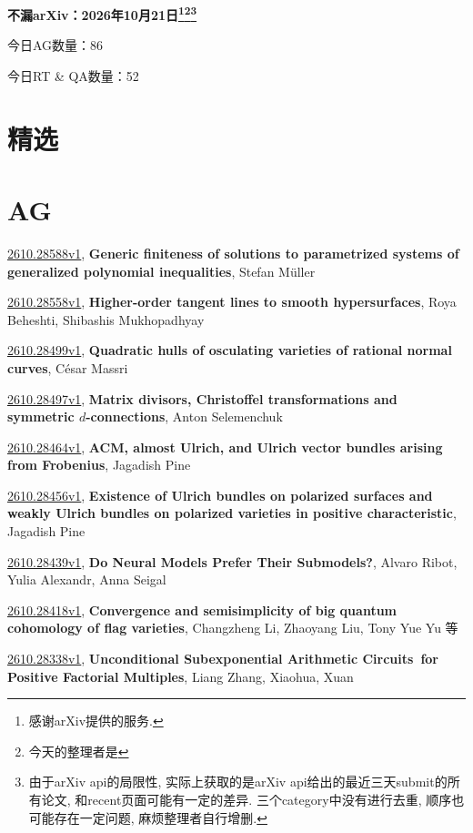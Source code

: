 \documentclass[9pt, a4paper]{article}
\theoremstyle{plain}
\theoremstyle{definition}
\theoremstyle{remark}
\newcommand{\arxiv}[3]{\href{https://arxiv.org/abs/#1}{#1}, \textbf{\textcolor{arxivblue}{#2}}, #3}
\newcommand{\AGnumber}{86}
\newcommand{\RTQAnumber}{52}
\newcommand{\NewestDate}{2026年10月21日}
\newcommand{\todayarXiver}{} %
\begin{document}
\begin{center}
    \Huge\textbf{不漏arXiv：\NewestDate\footnote{感谢arXiv提供的服务.}\footnote{今天的整理者是\todayarXiver}\footnote{由于arXiv api的局限性, 实际上获取的是arXiv api给出的最近三天submit的所有论文, 和recent页面可能有一定的差异. 三个category中没有进行去重, 顺序也可能存在一定问题, 麻烦整理者自行增删.}} \\
\end{center}

\setcounter{section}{-1}

\begin{center}
    今日AG数量：\AGnumber
    
    今日RT \& QA数量：\RTQAnumber
    
\end{center}


\section{精选}


\section{AG}
\arxiv{2610.28588v1}{Generic finiteness of solutions to parametrized systems of generalized polynomial inequalities}{Stefan Müller}

\arxiv{2610.28558v1}{Higher-order tangent lines to smooth hypersurfaces}{Roya Beheshti, Shibashis Mukhopadhyay}

\arxiv{2610.28499v1}{Quadratic hulls of osculating varieties of rational normal curves}{César Massri}

\arxiv{2610.28497v1}{Matrix divisors, Christoffel transformations and symmetric $d$-connections}{Anton Selemenchuk}

\arxiv{2610.28464v1}{ACM, almost Ulrich, and Ulrich vector bundles arising from Frobenius}{Jagadish Pine}

\arxiv{2610.28456v1}{Existence of Ulrich bundles on polarized surfaces and weakly Ulrich bundles on polarized varieties in positive characteristic}{Jagadish Pine}

\arxiv{2610.28439v1}{Do Neural Models Prefer Their Submodels?}{Alvaro Ribot, Yulia Alexandr, Anna Seigal}

\arxiv{2610.28418v1}{Convergence and semisimplicity of big quantum cohomology of flag varieties}{Changzheng Li, Zhaoyang Liu, Tony Yue Yu 等}

\arxiv{2610.28338v1}{Unconditional Subexponential Arithmetic Circuits\ for Positive Factorial Multiples}{Liang Zhang,  Xiaohua,  Xuan}
\end{document}
